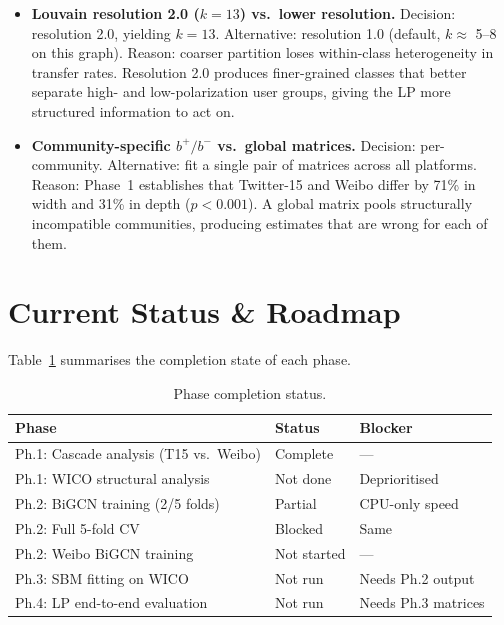 \documentclass[conference]{IEEEtran}
\begin{document}
\begin{itemize}
  \item \textbf{Louvain resolution 2.0 (\(k=13\)) vs.\ lower resolution.}
    Decision: resolution 2.0, yielding \(k=13\).
    Alternative: resolution 1.0 (default, \(k \approx\) 5--8 on this graph).
    Reason: coarser partition loses within-class heterogeneity in transfer
    rates.
    Resolution 2.0 produces finer-grained classes that better separate high-
    and low-polarization user groups, giving the LP more structured information
    to act on.

  \item \textbf{Community-specific \(b^+/b^-\) vs.\ global matrices.}
    Decision: per-community.
    Alternative: fit a single pair of matrices across all platforms.
    Reason: Phase~1 establishes that Twitter-15 and Weibo differ by 71\% in
    width and 31\% in depth (\(p < 0.001\)).
    A global matrix pools structurally incompatible communities, producing
    estimates that are wrong for each of them.

\end{itemize}

\section{Current Status \& Roadmap}

Table~\ref{tab:status} summarises the completion state of each phase.

\begin{table}[h]
\caption{Phase completion status.}
\label{tab:status}
\centering
\small
\begin{tabular}{p{3.2cm}p{1.5cm}p{2.0cm}}
\toprule
\textbf{Phase} & \textbf{Status} & \textbf{Blocker} \\
\midrule
Ph.1: Cascade analysis (T15 vs.\ Weibo) & Complete & --- \\
Ph.1: WICO structural analysis          & Not done & Deprioritised \\
Ph.2: BiGCN training (2/5 folds)        & Partial  & CPU-only speed \\
Ph.2: Full 5-fold CV                    & Blocked  & Same \\
Ph.2: Weibo BiGCN training              & Not started & --- \\
Ph.3: SBM fitting on WICO               & Not run  & Needs Ph.2 output \\
Ph.4: LP end-to-end evaluation          & Not run  & Needs Ph.3 matrices \\
\bottomrule
\end{tabular}
\end{table}
\end{document}
